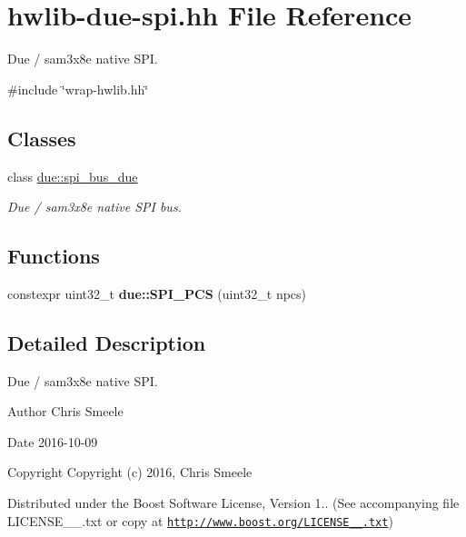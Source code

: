 \hypertarget{hwlib-due-spi_8hh}{}\section{hwlib-\/due-\/spi.hh File Reference}
\label{hwlib-due-spi_8hh}


Due / sam3x8e native S\+PI.  


{\ttfamily \#include \char`\"{}wrap-\/hwlib.\+hh\char`\"{}}\newline
\subsection*{Classes}
\begin{DoxyCompactItemize}
\item 
class \hyperlink{classdue_1_1spi__bus__due}{due\+::spi\+\_\+bus\+\_\+due}
\begin{DoxyCompactList}\small\item\em Due / sam3x8e native S\+PI bus. \end{DoxyCompactList}\end{DoxyCompactItemize}
\subsection*{Functions}
\begin{DoxyCompactItemize}
\item 
\mbox{\label{hwlib-due-spi_8hh_af52720fcb38ebf98b8dcf75b1bfc8188}} 
constexpr uint32\+\_\+t {\bfseries due\+::\+S\+P\+I\+\_\+\+P\+CS} (uint32\+\_\+t npcs)
\end{DoxyCompactItemize}


\subsection{Detailed Description}
Due / sam3x8e native S\+PI. 

\begin{DoxyAuthor}{Author}
Chris Smeele 
\end{DoxyAuthor}
\begin{DoxyDate}{Date}
2016-\/10-\/09 
\end{DoxyDate}
\begin{DoxyCopyright}{Copyright}
Copyright (c) 2016, Chris Smeele
\end{DoxyCopyright}
Distributed under the Boost Software License, Version 1.. (See accompanying file L\+I\+C\+E\+N\+S\+E\+\_\+\_.\+txt or copy at \href{http://www.boost.org/LICENSE_1_0.txt}{\tt http\+://www.\+boost.\+org/\+L\+I\+C\+E\+N\+S\+E\+\_\+\_.\+txt}) 